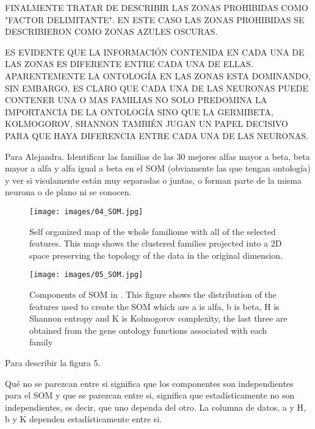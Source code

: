 \documentclass[preprint,12pt]{elsarticle}
\begin{document}
\bigbreak
\par FINALMENTE TRATAR DE DESCRIBIR LAS ZONAS PROHIBIDAS COMO "FACTOR DELIMITANTE". EN ESTE CASO LAS ZONAS PROHIBIDAS SE DESCRIBIERON COMO ZONAS AZULES OSCURAS. \par ES EVIDENTE QUE LA INFORMACIÓN CONTENIDA EN CADA UNA DE LAS ZONAS ES DIFERENTE ENTRE CADA UNA DE ELLAS. APARENTEMENTE LA ONTOLOGÍA EN LAS ZONAS ESTA DOMINANDO, SIN EMBARGO, ES CLARO QUE CADA UNA DE LAS NEURONAS PUEDE CONTENER UNA O MAS FAMILIAS NO SOLO PREDOMINA LA IMPORTANCIA DE LA ONTOLOGÍA SINO QUE LA GERMIBETA, KOLMOGOROV, SHANNON TAMBIÉN JUGAN UN PAPEL DECISIVO PARA QUE HAYA DIFERENCIA ENTRE CADA UNA DE LAS NEURONAS. \par Para Alejandra. Identificar las familias de las 30 mejores alfas mayor a beta, beta mayor a alfa y alfa igual a beta en el SOM  (obviamente las que tengan ontología) y ver si visulamente están muy separadas o juntas, o forman parte de la misma neurona o de plano ni se conocen. \par


\clearpage

\begin{figure}[htb]
	\centering
	\texttt{[image: images/04\_SOM.jpg]}
	\label{fig:som}
	\endminipage
	\caption{Self organized map of the whole familiome with all of the selected features.
	This map shows the clustered families projected into a 2D space preserving the topology of the data in the original dimension.}
\end{figure}

\clearpage

\begin{figure}[htb]
	\texttt{[image: images/05\_SOM.jpg]}
	\label{fig:som}
	\endminipage
	\caption{Components of SOM in \label{fig:som}. 
	This figure shows the distribution of the features used to create the SOM which are a is alfa, b is beta, H is Shannon entropy and K is Kolmogorov complexity, 
	the last three are obtained from the gene ontology functions associated with each family}

\end{figure}



Para describir la figura 5.

Qué no se parezcan entre si significa que los componentes son independientes para el SOM y que se parezcan entre si, significa que estadísticamente no son independientes, es decir, que uno dependa del otro. La columna de datos, a y H, b y K dependen estadísticamente entre si. 
\end{document}
